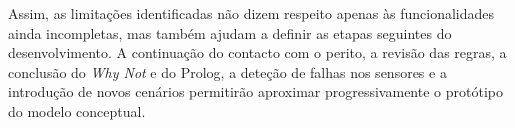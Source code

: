 Assim, as limitações identificadas não dizem respeito apenas às
funcionalidades ainda incompletas, mas também ajudam a definir as etapas
seguintes do desenvolvimento. A continuação do contacto com o perito, a
revisão das regras, a conclusão do \emph{Why Not} e do Prolog, a deteção de
falhas nos sensores e a introdução
de novos cenários permitirão aproximar progressivamente o protótipo do modelo
conceptual.

